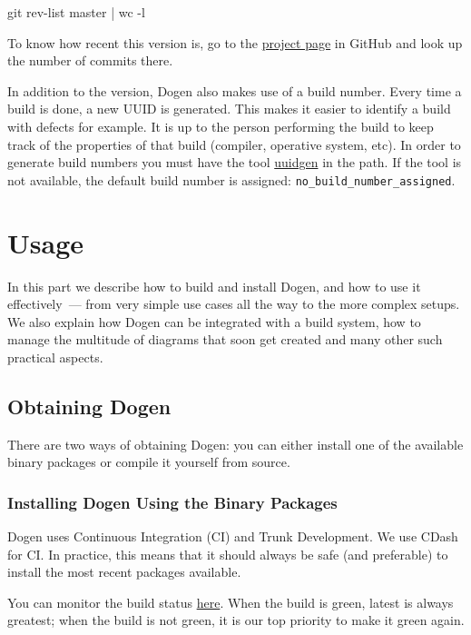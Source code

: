 \documentclass{book}
\begin{document}
\begin{pseudocode}[backgroundcolor=\color{lightgray}]
git rev-list master | wc -l
\end{pseudocode}

To know how recent this version is, go to the
\href{https://github.com/DomainDrivenConsulting/dogen}{project page}
in GitHub and look up the number of commits there.

In addition to the version, Dogen also makes use of a build
number. Every time a build is done, a new UUID is generated. This
makes it easier to identify a build with defects for example. It is up
to the person performing the build to keep track of the properties of
that build (compiler, operative system, etc). In order to generate
build numbers you must have the tool
\href{http://www.linuxcommand.org/man_pages/uuidgen1.html}{uuidgen} in
the path. If the tool is not available, the default build number is
assigned: \texttt{no\_build\_number\_assigned}.

\part{Usage}
\label{usage}

In this part we describe how to build and install Dogen, and how to
use it effectively~--- from very simple use cases all the way to the
more complex setups. We also explain how Dogen can be integrated with
a build system, how to manage the multitude of diagrams that soon get
created and many other such practical aspects.

\chapter{Obtaining Dogen}

There are two ways of obtaining Dogen: you can either install one of
the available binary packages or compile it yourself from source.

\section{Installing Dogen Using the Binary Packages}

Dogen uses Continuous Integration (CI) and Trunk Development. We use
CDash for CI. In practice, this means that it should always be safe
(and preferable) to install the most recent packages available.

You can monitor the build status
\href{http://my.cdash.org/index.php?project\%3DDogen}{here}. When the
build is green, latest is always greatest; when the build is not
green, it is our top priority to make it green again.
\end{document}

